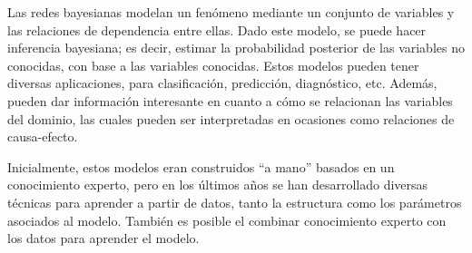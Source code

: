 Las redes bayesianas modelan un fenómeno mediante un conjunto de variables y las relaciones de dependencia entre ellas. Dado este modelo, se puede hacer inferencia bayesiana; es decir, estimar la probabilidad posterior de las variables no conocidas, con base a las variables conocidas. Estos modelos pueden tener diversas aplicaciones, para clasificación, predicción, diagnóstico, etc. Además, pueden dar información interesante en cuanto a cómo se relacionan las variables del dominio, las cuales pueden ser interpretadas en ocasiones como relaciones de causa-efecto. 

Inicialmente, estos modelos eran construidos ``a mano'' basados en un conocimiento experto, pero en los últimos años se han desarrollado diversas técnicas para aprender a partir de datos, tanto la estructura como los parámetros asociados al modelo. También es posible el combinar conocimiento experto con los datos para aprender el modelo.



